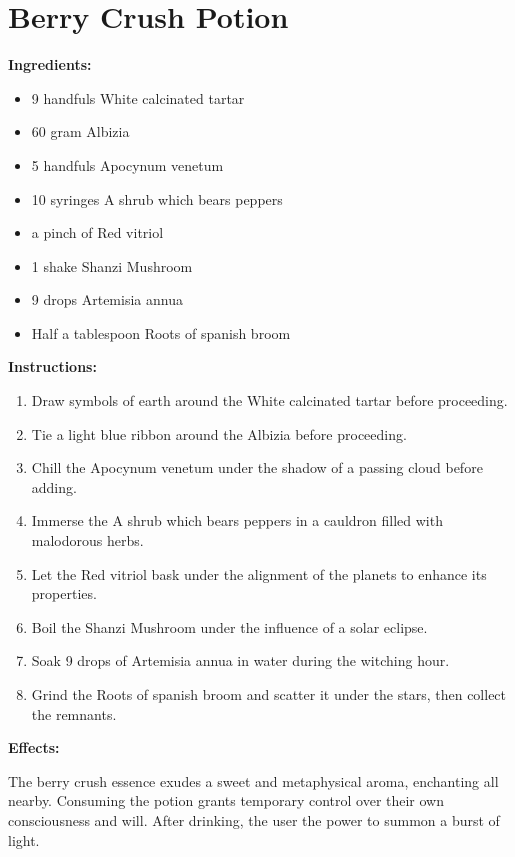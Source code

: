\documentclass{article}
\begin{document}
\newpage
\section*{Berry Crush Potion}

\textbf{Ingredients:}

\begin{itemize}
  \item 9 handfuls White calcinated tartar
  \item 60 gram Albizia
  \item 5 handfuls Apocynum venetum
  \item 10 syringes A shrub which bears peppers
  \item a pinch of Red vitriol
  \item 1 shake Shanzi Mushroom
  \item 9 drops Artemisia annua
  \item Half a tablespoon Roots of spanish broom
\end{itemize}

\textbf{Instructions:}

\begin{enumerate}
  \item Draw symbols of earth around the White calcinated tartar before proceeding.
  \item Tie a light blue ribbon around the Albizia before proceeding.
  \item Chill the Apocynum venetum under the shadow of a passing cloud before adding.
  \item Immerse the A shrub which bears peppers in a cauldron filled with malodorous herbs.
  \item Let the Red vitriol bask under the alignment of the planets to enhance its properties.
  \item Boil the Shanzi Mushroom under the influence of a solar eclipse.
  \item Soak 9 drops of Artemisia annua in water during the witching hour.
  \item Grind the Roots of spanish broom and scatter it under the stars, then collect the remnants.
\end{enumerate}

\textbf{Effects:}

The berry crush essence exudes a sweet and metaphysical aroma, enchanting all nearby. Consuming the potion grants temporary control over their own consciousness and will. After drinking, the user the power to summon a burst of light.
\end{document}
